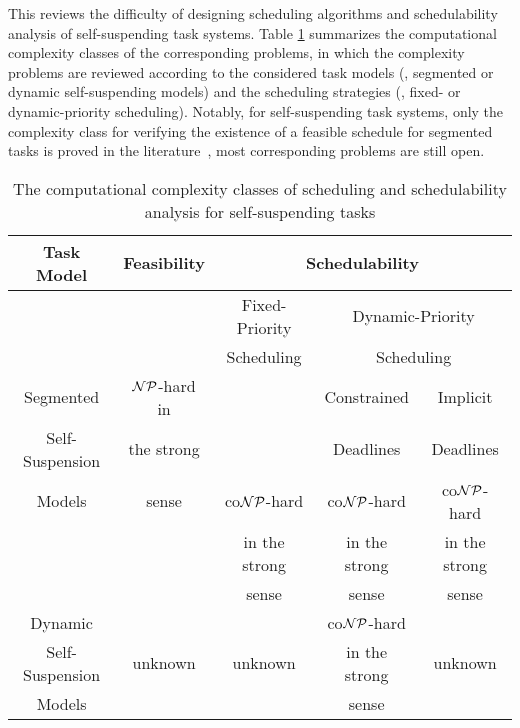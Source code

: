 \label{sec:hardness}
This \mysectionrefnormal{} reviews the difficulty of designing scheduling algorithms and schedulability analysis of self-suspending task systems. Table \ref{table:complexity} summarizes the computational complexity classes of the corresponding problems, in which the complexity problems are reviewed according to the considered task models (\ie, segmented or dynamic self-suspending models) and the scheduling strategies (\ie, fixed- or dynamic-priority scheduling). Notably, for self-suspending task systems, only the complexity class for verifying the existence of a feasible schedule for segmented tasks is proved in the literature~\cite{Ric03,Ridouard_2004}, most corresponding problems are still open.

\begin{table}[t]
\centering
    \begin{tabular}{|c|c|c|c|c|}
 \hline
        Task Model & Feasibility & \multicolumn{3}{c|}{Schedulability} \\
        \hline
        &  & Fixed-Priority & \multicolumn{2}{c|}{Dynamic-Priority}\\
        &  & Scheduling     & \multicolumn{2}{c|}{Scheduling}\\
        \cline{3-5}    
        Segmented & ${\cal NP}$-hard in &  & Constrained & Implicit\\
         Self-Suspension  & the strong &   & Deadlines   & Deadlines \\
        \cline{4-5}
        Models & sense \cite{Ric03,Ridouard_2004} & co${\cal NP}$-hard& co${\cal NP}$-hard & co${\cal NP}$-hard \\
        &  & in the strong & in the strong & in the strong\\
        & & sense \cite{DBLP:conf/rtns/MohaqeqiE016,RTSS2016-suspension}& sense \cite{RTSS2016-suspension}& sense \cite{RTSS2016-suspension}\\
        \hline
        Dynamic & \multirow{3}{*}{unknown} & & co${\cal NP}$-hard & \multirow{3}{*}{unknown}\\
         Self-Suspension & & unknown &in the strong& \\
        Models & & & sense \cite{RTSS2016-suspension}& \\
        \hline
    \end{tabular}
    \vskip 0.2in
    \caption{The computational complexity classes of scheduling and schedulability analysis for self-suspending tasks}
    \label{table:complexity}
\end{table}

